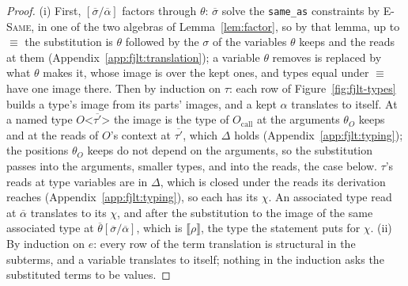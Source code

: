 \begin{proof}
(i) First, $[\overline{\sigma}/\overline{\alpha}]$ factors through $\theta$: $\overline{\sigma}$ solve the \texttt{same\_as} constraints by \textsc{E-Same}, in one of the two algebras of Lemma~\ref{lem:factor}, so by that lemma, up to $\equiv$ the substitution is $\theta$ followed by the $\sigma$ of the variables $\theta$ keeps and the reads at them (Appendix~\ref{app:fjlt:translation}); a variable $\theta$ removes is replaced by what $\theta$ makes it, whose image is over the kept ones, and types equal under $\equiv$ have one image there.
Then by induction on $\tau$: each row of Figure~\ref{fig:fjlt-types} builds a type's image from its parts' images, and a kept $\alpha$ translates to itself.
At a named type $O\texttt{<}\overline{\tau'}\texttt{>}$ the image is the type of $O_{\mathrm{call}}$ at the arguments $\theta_O$ keeps and at the reads of $O$'s context at $\overline{\tau'}$, which $\Delta$ holds (Appendix~\ref{app:fjlt:typing}); the positions $\theta_O$ keeps do not depend on the arguments, so the substitution passes into the arguments, smaller types, and into the reads, the case below.
$\tau$'s reads at type variables are in $\Delta$, which is closed under the reads its derivation reaches (Appendix~\ref{app:fjlt:typing}), so each has its $\chi$.
An associated type read at $\overline{\alpha}$ translates to its $\chi$, and after the substitution to the image of the same associated type at $\overline{\theta}[\overline{\sigma}/\overline{\alpha}]$, which is $\llbracket \rho \rrbracket$, the type the statement puts for $\chi$.
(ii) By induction on $e$: every row of the term translation is structural in the subterms, and a variable translates to itself; nothing in the induction asks the substituted terms to be values.
\end{proof}

